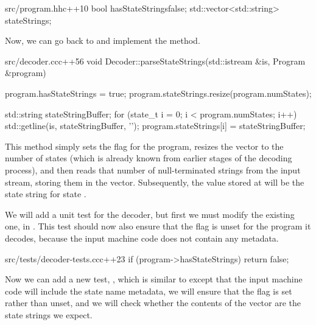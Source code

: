 \begin{file}{src/program.hh}{c++}{10}
    bool hasStateStrings{false};
    std::vector<std::string> stateStrings;
\end{file}

Now, we can go back to  and implement the  method.

\begin{file}{src/decoder.cc}{c++}{56}
void Decoder::parseStateStrings(std::istream &is, Program &program)
{
    program.hasStateStrings = true;
    program.stateStrings.resize(program.numStates);

    std::string stateStringBuffer;
    for (state_t i = 0; i < program.numStates; i++)
    {
        std::getline(is, stateStringBuffer, '\0');
        program.stateStrings[i] = stateStringBuffer;
    }
}
\end{file}

This method simply sets the  flag for the program, resizes the  vector to the number of states (which is already known from earlier stages of the decoding process), and then reads that number of null-terminated strings from the input stream, storing them in the  vector. Subsequently, the value stored at  will be the state string for state .

We will add a unit test for the decoder, but first we must modify the existing one,  in . This test should now also ensure that the  flag is unset for the program it decodes, because the input machine code does not contain any metadata.

\begin{file}{src/tests/decoder-tests.cc}{c++}{23}
    if (program->hasStateStrings)
        return false;
\end{file}

Now we can add a new test, , which is similar to  except that the input machine code will include the state name metadata, we will ensure that the  flag is set rather than unset, and we will check whether the contents of the  vector are the state strings we expect.

